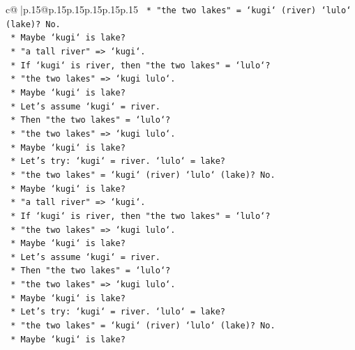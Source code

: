 \documentclass{article}
\begin{document}
{\begin{supertabular}{c@{$\;$}|p{.15\linewidth}@{}p{.15\linewidth}p{.15\linewidth}p{.15\linewidth}p{.15\linewidth}p{.15\linewidth}}
{{{\texttt{                    *   "the two lakes" = `kugi` (river) `lulo` (lake)? No.} \\
\texttt{                    *   Maybe `kugi` is lake?} \\
\texttt{                    *   "a tall river" => `kugi`.} \\
\texttt{                    *   If `kugi` is river, then "the two lakes" = `lulo`?} \\
\texttt{                    *   "the two lakes" => `kugi lulo`.} \\
\texttt{                    *   Maybe `kugi` is lake?} \\
\texttt{                    *   Let's assume `kugi` = river.} \\
\texttt{                    *   Then "the two lakes" = `lulo`?} \\
\texttt{                    *   "the two lakes" => `kugi lulo`.} \\
\texttt{                    *   Maybe `kugi` is lake?} \\
\texttt{                    *   Let's try: `kugi` = river. `lulo` = lake?} \\
\texttt{                    *   "the two lakes" = `kugi` (river) `lulo` (lake)? No.} \\
\texttt{                    *   Maybe `kugi` is lake?} \\
\texttt{                    *   "a tall river" => `kugi`.} \\
\texttt{                    *   If `kugi` is river, then "the two lakes" = `lulo`?} \\
\texttt{                    *   "the two lakes" => `kugi lulo`.} \\
\texttt{                    *   Maybe `kugi` is lake?} \\
\texttt{                    *   Let's assume `kugi` = river.} \\
\texttt{                    *   Then "the two lakes" = `lulo`?} \\
\texttt{                    *   "the two lakes" => `kugi lulo`.} \\
\texttt{                    *   Maybe `kugi` is lake?} \\
\texttt{                    *   Let's try: `kugi` = river. `lulo` = lake?} \\
\texttt{                    *   "the two lakes" = `kugi` (river) `lulo` (lake)? No.} \\
\texttt{                    *   Maybe `kugi` is lake?} \\
}}}
\end{supertabular}}
\end{document}
